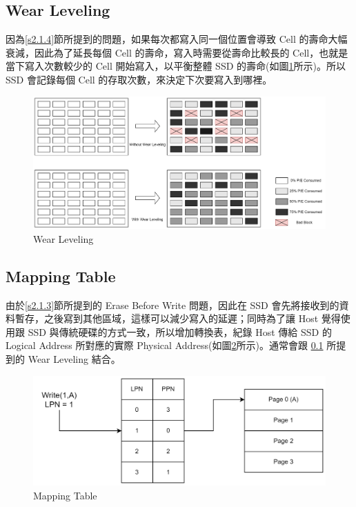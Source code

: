 \subsection{Wear Leveling}\label{s2.2.1}
\indent
因為\ref{s2.1.4}節所提到的問題，如果每次都寫入同一個位置會導致 Cell 的壽命大幅衰減，因此為了延長每個 Cell 的壽命，寫入時需要從壽命比較長的 Cell，也就是當下寫入次數較少的 Cell 開始寫入，以平衡整體 SSD 的壽命(如圖\ref{f2.5}所示)。所以 SSD 會記錄每個 Cell 的存取次數，來決定下次要寫入到哪裡。\cite{Wear_Leveling_Thesis}
\begin{figure}[H]
    \centering
    \includegraphics[width=1\textwidth]{picture/ch2/Wear_Leveling.png}
    \caption{Wear Leveling\cite{Wear_Leveling_Pic}}
    \label{f2.5}
\end{figure}

\subsection{Mapping Table}\label{s2.2.2}
\indent
由於\ref{s2.1.3}節所提到的 Erase Before Write 問題，因此在 SSD 會先將接收到的資料暫存，之後寫到其他區域，這樣可以減少寫入的延遲；同時為了讓 Host 覺得使用跟 SSD 與傳統硬碟的方式一致，所以增加轉換表，紀錄 Host 傳給 SSD 的 Logical Address 所對應的實際 Physical Address(如圖\ref{f2.6}所示)。通常會跟 \ref{s2.2.1} 所提到的 Wear Leveling 結合。
\begin{figure}[H]
    \centering
    \includegraphics[width=1\textwidth]{picture/ch2/mapping_table.png}
    \caption{Mapping Table\cite{Mapping_Table}}
    \label{f2.6}
\end{figure}

